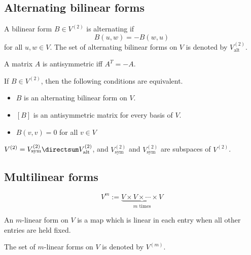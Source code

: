 \subsection{Alternating bilinear forms}

\begin{definition}
  A bilinear form $B \in V^{(2)}$ is alternating if
  \[
    B(u, w) = -B(w, u)
  \]
  for all $u, w \in V$. The set of alternating bilinear forms on $V$ is denoted by $V^{(2)}_{\text{alt}}$.
\end{definition}

\begin{definition}
  A matrix $A$ is antisymmetric iff $A^T = -A$.
\end{definition}

\begin{theorem}
  If $B \in V^{(2)}$, then the following conditions are equivalent.
  \begin{itemize}
    \item $B$ is an alternating bilinear form on $V$.
    \item $[B]$ is an antisymmetric matrix for every basis of $V$.
    \item $B(v, v) = 0$ for all $v \in V$
  \end{itemize}
\end{theorem}

\begin{lemma}
  $V^{(2)} = V^{(2)}_{\text{sym}} \directsum V^{(2)}_{\text{alt}}$, and $V^{(2)}_{\text{sym}}$ and $V^{(2)}_{\text{sym}}$ are subspaces of $V^{(2)}$.
\end{lemma}

\subsection{Multilinear forms}

\begin{definition}
  \[
    V^m := \underbrace{V \times V \times \cdots \times V}_{\text{$m$ times}}
  \]
\end{definition}

\begin{definition}
  An $m$-linear form on $V$ is a map which is linear in each entry when all other entries are held fixed.

  The set of $m$-linear forms on $V$ is denoted by $V^{(m)}$.
\end{definition}

